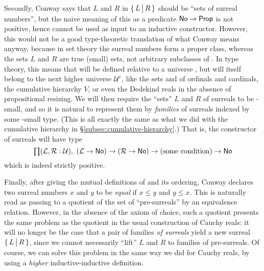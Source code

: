 Secondly, Conway says that $L$ and $R$ in $\{\,L\,\big|\,R\,\}$ should be ``sets of surreal numbers'', but the naive meaning of this as a predicate $\mathsf{No}\to\mathsf{Prop}$ is not positive, hence cannot be used as input to an inductive constructor.
However, this would not be a good type-theoretic translation of what Conway means anyway, because in set theory the surreal numbers form a proper class, whereas the sets $L$ and $R$ are true (small) sets, not arbitrary subclasses of \NO.
In type theory, this means that \NO will be defined relative to a universe \UU, but will itself belong to the next higher universe $\mathcal{U}'$, like the sets \ord and \card of ordinals and cardinals, the cumulative hierarchy $V$, or even the Dedekind reals in the absence of propositional resizing.
We will then require the ``sets'' $L$ and $R$ of surreals to be \UU-small, and so it is natural to represent them by \emph{families} of surreals indexed by some \UU-small type.
(This is all exactly the same as what we did with the cumulative hierarchy in \S\ref{subsec:cumulative-hierarchy}.)
That is, the constructor of surreals will have type
\[ \prd{\LL,\RR:\UU} (\LL\to\NO) \to (\RR\to \NO) \to (\text{some condition}) \to \NO \]
which is indeed strictly positive.

Finally, after giving the mutual definitions of \NO and its ordering, Conway declares two surreal numbers $x$ and $y$ to be \emph{equal} if $x\le y$ and $y\le x$.
This is naturally read as passing to a quotient of the set of ``pre-surreals'' by an equivalence relation.
However, in the absence of the axiom of choice, such a quotient presents the same problem as the quotient in the usual construction of Cauchy reals: it will no longer be the case that a pair of families \emph{of surreals} yield a new surreal $\{\,L\,\big|\,R\,\}$, since we cannot necessarily ``lift'' $L$ and $R$ to families of pre-surreals.
Of course, we can solve this problem in the same way we did for Cauchy reals, by using a \emph{higher} inductive-inductive definition.

